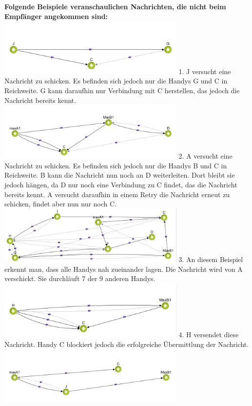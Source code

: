 \textbf{Folgende Beispiele veranschaulichen Nachrichten, die nicht beim
Empfänger angekommen sind:}
\includegraphics[width=0.7\textwidth]{belege/grosstests/Bilder/Miserfolg6.jpg} 1. J versucht
eine Nachricht zu schicken. Es befinden sich jedoch nur die Handys G und
C in Reichweite. G kann daraufhin nur Verbindung mit C herstellen, das
jedoch die Nachricht bereits kennt.
\includegraphics[width=0.7\textwidth]{belege/grosstests/Bilder/Miserfolg5.jpg} 2. A versucht
eine Nachricht zu schicken. Es befinden sich jedoch nur die Handys B und
C in Reichweite. B kann die Nachricht nun noch an D weiterleiten. Dort
bleibt sie jedoch hängen, da D nur noch eine Verbindung zu C findet, das
die Nachricht bereits kennt. A versucht daraufhin in einem Retry die
Nachricht erneut zu schicken, findet aber nun nur noch C.
\includegraphics[width=0.7\textwidth]{belege/grosstests/Bilder/Miserfolg4.jpg} 3. An diesem
Beispiel erkennt man, dass alle Handys nah zueinander lagen. Die
Nachricht wird von A verschickt. Sie durchläuft 7 der 9 anderen Handys.
\includegraphics[width=0.7\textwidth]{belege/grosstests/Bilder/Miserfolg3.jpg} 4. H versendet
diese Nachricht. Handy C blockiert jedoch die erfolgreiche Übermittlung
der Nachricht. \includegraphics[width=0.7\textwidth]{belege/grosstests/Bilder/Miserfolg2.jpg}
